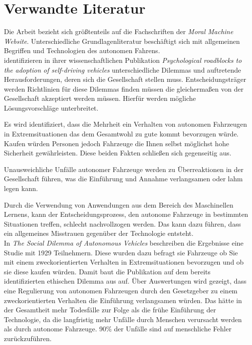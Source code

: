 \section{Verwandte Literatur}
\label{sec:verwandte-literatur}

Die Arbeit bezieht sich größtenteils auf die Fachschriften der \textit{Moral Machine Website}. Unterschiedliche Grundlagenliteratur beschäftigt sich mit allgemeinen Begriffen und Technologien des autonomen Fahrens.\\

\citeauthor{roadblocks} identifizieren in ihrer wissenschaftlichen Publikation \textit{Psychological roadblocks to the adoption of self-driving vehicles} \cite{roadblocks} unterschiedliche Dilemmas und auftretende Herausforderungen, deren sich die Gesellschaft stellen muss. Entscheidungsträger werden Richtlinien für diese Dilemmas finden müssen die gleichermaßen von der Gesellschaft akzeptiert werden müssen. Hierfür werden mögliche Lösungsvorschläge unterbreitet. 

Es wird identifiziert, dass die Mehrheit ein Verhalten von autonomen Fahrzeugen in Extremsituationen das dem Gesamtwohl zu gute kommt bevorzugen würde. Kaufen würden Personen jedoch Fahrzeuge die Ihnen selbst möglichst hohe Sicherheit gewährleisten. Diese beiden Fakten schließen sich gegenseitig aus.

Unausweichliche Unfälle autonomer Fahrzeuge werden zu Überreaktionen in der Gesellschaft führen, was die Einführung und Annahme verlangsamen oder lahm legen kann.

Durch die Verwendung von Anwendungen aus dem Bereich des Maschinellen Lernens, kann der Entscheidungsprozess, den autonome Fahrzeuge in bestimmten Situationen treffen, schlecht nachvollzogen werden. Das kann dazu führen, dass ein allgemeines  Misstrauen gegenüber der Technologie  entsteht.\\

In \textit{The Social Dilemma of Autonomous Vehicles} \cite{socialDilemma} beschreiben \citeauthor{socialDilemma} die Ergebnisse eine Studie mit 1929 Teilnehmern. Diese wurden dazu befragt sie Fahrzeuge ob Sie mit einem zweckorientierten Verhalten in Extremsituationen bevorzugen und ob sie diese kaufen würden. Damit baut die Publikation auf dem bereits identifizierten ethischen Dilemma aus \cite{roadblocks} auf. Über Auswertungen wird gezeigt, dass eine Regulierung von autonomen Fahrzeugen durch den Gesetzgeber zu einem zweckorientierten Verhalten die Einführung verlangsamen würden. Das hätte in der Gesamtheit mehr Todesfälle zur Folge als die frühe Einführung der Technologie, da die langfristig mehr Unfälle durch Menschen verursacht werden als durch autonome Fahrzeuge. 90\% der Unfälle sind auf menschliche Fehler zurückzuführen.\\

